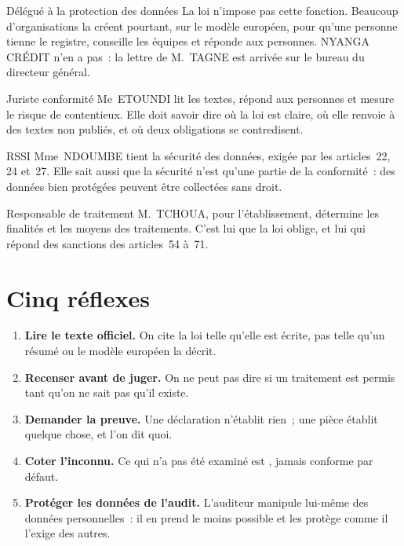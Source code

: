 \begin{boxmetier}{Délégué à la protection des données}
La loi n'impose pas cette fonction. Beaucoup d'organisations la créent
pourtant, sur le modèle européen, pour qu'une personne tienne le registre,
conseille les équipes et réponde aux personnes. NYANGA CRÉDIT n'en a pas~:
la lettre de M.~TAGNE est arrivée sur le bureau du directeur général.
\end{boxmetier}

\begin{boxmetier}{Juriste conformité}
Me~ETOUNDI lit les textes, répond aux personnes et mesure le risque de
contentieux. Elle doit savoir dire où la loi est claire, où elle renvoie à
des textes non publiés, et où deux obligations se contredisent.
\end{boxmetier}

\begin{boxmetier}{RSSI}
Mme~NDOUMBE tient la sécurité des données, exigée par les articles~22, 24
et~27. Elle sait aussi que la sécurité n'est qu'une partie de la
conformité~: des données bien protégées peuvent être collectées sans droit.
\end{boxmetier}

\begin{boxmetier}{Responsable de traitement}
M.~TCHOUA, pour l'établissement, détermine les finalités et les moyens des
traitements. C'est lui que la loi oblige, et lui qui répond des sanctions
des articles~54 à~71.
\end{boxmetier}

\section{Cinq réflexes}
\label{sec:p00-reflexes}

\begin{enumerate}
    \item \textbf{Lire le texte officiel.} On cite la loi telle qu'elle est
          écrite, pas telle qu'un résumé ou le modèle européen la décrit.
    \item \textbf{Recenser avant de juger.} On ne peut pas dire si un
          traitement est permis tant qu'on ne sait pas qu'il existe.
    \item \textbf{Demander la preuve.} Une déclaration n'établit rien~; une
          pièce établit quelque chose, et l'on dit quoi.
    \item \textbf{Coter l'inconnu.} Ce qui n'a pas été examiné est \NEK{},
          jamais conforme par défaut.
    \item \textbf{Protéger les données de l'audit.} L'auditeur manipule
          lui-même des données personnelles~: il en prend le moins
          possible et les protège comme il l'exige des autres.
\end{enumerate}

